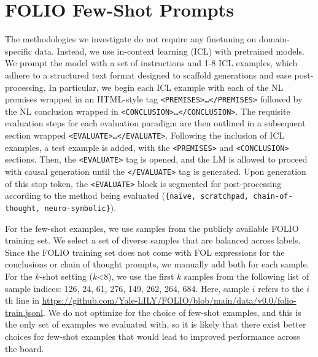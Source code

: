 \section{FOLIO Few-Shot Prompts}
\label{sec:appendix_folio_prompts}
The methodologies we investigate do not require any finetuning on domain-specific data.
Instead, we use in-context learning (ICL) with pretrained models.
We prompt the model with a set of instructions and 1-8 ICL examples, which adhere to a structured text format designed to scaffold generations and ease post-processing.
In particular, we begin each ICL example with each of the NL premises wrapped in an HTML-style tag \texttt{<PREMISES>\dots</PREMISES>} followed by the NL conclusion wrapped in \texttt{<CONCLUSION>\dots</CONCLUSION>}.
The requisite evaluation steps for each evaluation paradigm are then outlined in a subsequent section wrapped \texttt{<EVALUATE>\dots</EVALUATE>}.
Following the inclusion of ICL examples, a test example is added, with the \texttt{<PREMISES>} and \texttt{<CONCLUSION>} sections.
Then, the \texttt{<EVALUATE>} tag is opened, and the LM is allowed to proceed with causal generation until the \texttt{</EVALUATE>} tag is generated.
Upon generation of this stop token, the \texttt{<EVALUATE>} block is segmented for post-processing according to the method being evaluated (\texttt{\{na\"ive, scratchpad, chain-of-thought, neuro-symbolic\}}).

For the few-shot examples, we use samples from the publicly available FOLIO training set.
We select a set of diverse samples that are balanced across labels.
Since the FOLIO training set does not come with FOL expressions for the conclusions or chain of thought prompts, we manually add both for each sample.
For the $k$-shot setting ($k$<8), we use the first $k$ samples from the following list of sample indices: 126, 24, 61, 276, 149, 262, 264, 684.
Here, sample $i$ refers to the $i$th line in \url{https://github.com/Yale-LILY/FOLIO/blob/main/data/v0.0/folio-train.jsonl}.
We do not optimize for the choice of few-shot examples, and this is the only set of examples we evaluated with, so it is likely that there exist better choices for few-shot examples that would lead to improved performance across the board.
